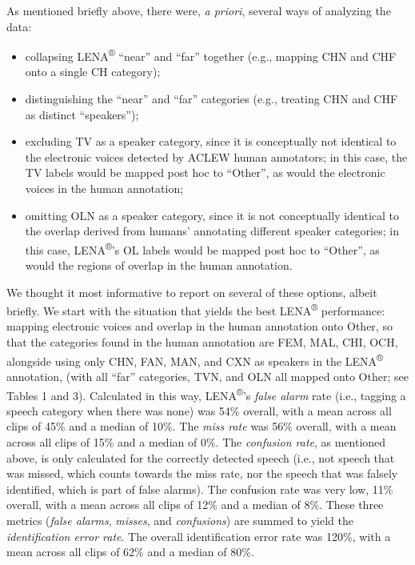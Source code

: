 \documentclass[english,table,man,floatsintext]{apa6}
\providecommand{\tightlist}{%
  \setlength{\itemsep}{0pt}\setlength{\parskip}{0pt}}
\begin{document}
As mentioned briefly above, there were, \emph{a priori}, several ways of analyzing the data:

\begin{itemize}
\tightlist
\item
  collapsing LENA\textsuperscript{®} \enquote{near} and \enquote{far} together (e.g., mapping CHN and CHF onto a single CH category);
\item
  distinguishing the \enquote{near} and \enquote{far} categories (e.g., treating CHN and CHF as distinct \enquote{speakers});
\item
  excluding TV as a speaker category, since it is conceptually not identical to the electronic voices detected by ACLEW human annotators; in this case, the TV labels would be mapped post hoc to \enquote{Other}, as would the electronic voices in the human annotation;
\item
  omitting OLN as a speaker category, since it is not conceptually identical to the overlap derived from humans' annotating different speaker categories; in this case, LENA\textsuperscript{®}'s OL labels would be mapped post hoc to \enquote{Other}, as would the regions of overlap in the human annotation.
\end{itemize}

We thought it most informative to report on several of these options, albeit briefly. We start with the situation that yields the best LENA\textsuperscript{®} performance: mapping electronic voices and overlap in the human annotation onto Other, so that the categories found in the human annotation are FEM, MAL, CHI, OCH, alongside using only CHN, FAN, MAN, and CXN as speakers in the LENA\textsuperscript{®} annotation, (with all \enquote{far} categories, TVN, and OLN all mapped onto Other; see Tables 1 and 3).
Calculated in this way, LENA\textsuperscript{®}'s \emph{false alarm} rate (i.e., tagging a speech category when there was none) was 54\% overall, with a mean across all clips of 45\% and a median of 10\%. The \emph{miss rate} was 56\% overall, with a mean across all clips of 15\% and a median of 0\%. The \emph{confusion rate}, as mentioned above, is only calculated for the correctly detected speech (i.e., not speech that was missed, which counts towards the miss rate, nor the speech that was falsely identified, which is part of false alarms). The confusion rate was very low, 11\% overall, with a mean across all clips of 12\% and a median of 8\%. These three metrics (\emph{false alarms}, \emph{misses}, and \emph{confusions}) are summed to yield the \emph{identification error rate}. The overall identification error rate was 120\%, with a mean across all clips of 62\% and a median of 80\%.
\end{document}
